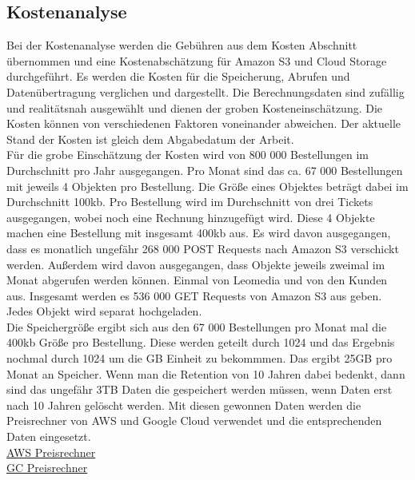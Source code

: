 \newpage

\subsection{Kostenanalyse}

Bei der Kostenanalyse werden die Gebühren aus dem Kosten Abschnitt übernommen und eine Kostenabschätzung für Amazon S3 und Cloud Storage durchgeführt. Es werden die Kosten für die Speicherung, Abrufen und Datenübertragung verglichen und dargestellt. Die Berechnungsdaten sind zufällig und realitätsnah ausgewählt und dienen der groben Kosteneinschätzung. Die Kosten können von verschiedenen Faktoren voneinander abweichen. Der aktuelle Stand der Kosten ist gleich dem Abgabedatum der Arbeit.\\

Für die grobe Einschätzung der Kosten wird von 800 000 Bestellungen im Durchschnitt pro Jahr ausgegangen. Pro Monat sind das ca. 67 000 Bestellungen mit jeweils 4 Objekten pro Bestellung. Die Größe eines Objektes beträgt dabei im Durchschnitt 100kb. Pro Bestellung wird im Durchschnitt von drei Tickets ausgegangen, wobei noch eine Rechnung hinzugefügt wird. Diese 4 Objekte machen eine Bestellung mit insgesamt 400kb aus. Es wird davon ausgegangen, dass es monatlich ungefähr 268 000 POST Requests nach Amazon S3 verschickt werden. Außerdem wird davon ausgegangen, dass Objekte jeweils zweimal im Monat abgerufen werden können. Einmal von Leomedia und von den Kunden aus. Insgesamt werden es 536 000 GET Requests von Amazon S3 aus geben. Jedes Objekt wird separat hochgeladen.\\

Die Speichergröße ergibt sich aus den 67 000 Bestellungen pro Monat mal die 400kb Größe pro Bestellung. Diese werden geteilt durch 1024 und das Ergebnis nochmal durch 1024 um die GB Einheit zu bekommmen. Das ergibt 25GB pro Monat an Speicher. Wenn man die Retention von 10 Jahren dabei bedenkt, dann sind das ungefähr 3TB Daten die gespeichert werden müssen, wenn Daten erst nach 10 Jahren gelöscht werden. Mit diesen gewonnen Daten werden die Preisrechner von AWS und Google Cloud verwendet und die entsprechenden Daten eingesetzt.\\

\href{https://calculator.aws/}{AWS Preisrechner}\\
\href{https://cloud.google.com/products/calculator}{GC Preisrechner}\\

\newpage

